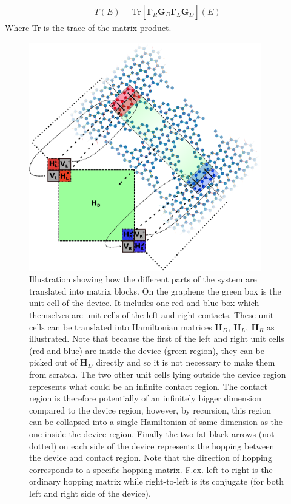 \begin{align}
    T(E) = \text{Tr}[\mathbf{\Gamma}_R\mathbf{G}_D\mathbf{\Gamma}_L\mathbf{G}_D^{\dagger}](E)
    \label{transeq}
\end{align}
Where Tr is the trace of the matrix product. 
\begin{figure}
    \centering
    \includegraphics[width=0.9\textwidth]{Figures/illu.eps}
    \caption{Illustration showing how the different parts of the system are translated into matrix blocks. On the graphene the green box is the unit cell of the device. It includes one red and blue box which themselves are unit cells of the left and right contacts. These unit cells can be translated into Hamiltonian matrices \(\textbf{H}_D, \ \textbf{H}_L,\ \textbf{H}_R\) as illustrated. Note that because the first of the left and right unit cells (red and blue) are inside the device (green region), they can be picked out of \(\textbf{H}_D\) directly and so it is not necessary to make them from scratch. The two other unit cells lying outside the device region represents what could be an infinite contact region. The contact region is therefore potentially of an infinitely bigger dimension compared to the device region, however, by recursion, this region can be collapsed into a single Hamiltonian of same dimension as the one inside the device region. Finally the two fat black arrows (not dotted) on each side of the device represents the hopping between the device and contact region. Note that the direction of hopping corresponds to a specific hopping matrix. F.ex. left-to-right is the ordinary hopping matrix while right-to-left is its conjugate (for both left and right side of the device).}
    \label{systemillu}
\end{figure}
